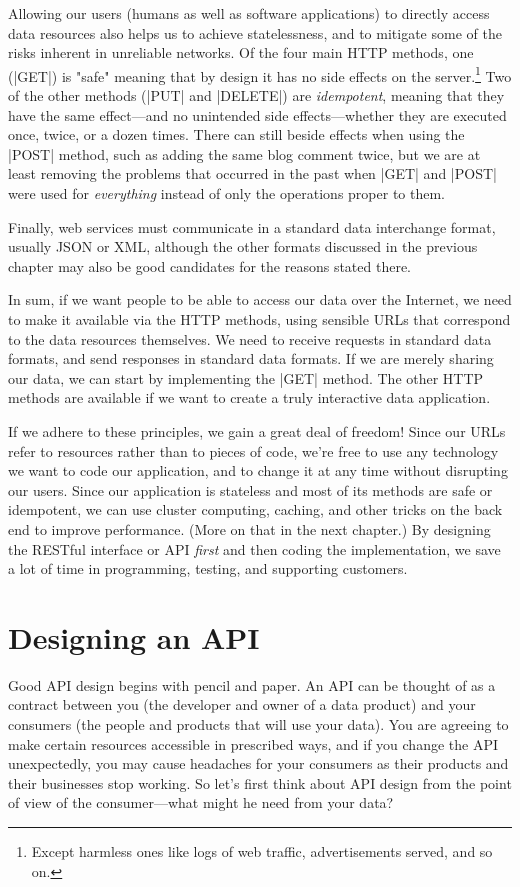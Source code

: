 \documentclass[11pt]{book}
\newcommand{\term}[1]{\emph{#1}} %
\begin{document}
Allowing our users (humans as well as software applications) to directly access data resources also helps us to achieve statelessness, and to mitigate some of the risks inherent in unreliable networks.  Of the four main HTTP methods, one (|GET|) is "safe" meaning that by design it has no side effects on the server.\footnote{Except harmless ones like logs of web traffic, advertisements served, and so on.}  Two of the other methods (|PUT| and |DELETE|) are \term{idempotent}, meaning that they have the same effect---and no unintended side effects---whether they are executed once, twice, or a dozen times.  There can still beside effects when using the |POST| method, such as adding the same blog comment twice, but we are at least removing the problems that occurred in the past when |GET| and |POST| were used for \emph{everything} instead of only the operations proper to them.

Finally, web services must communicate in a standard data interchange format, usually JSON or XML, although the other formats discussed in the previous chapter may also be good candidates for the reasons stated there.

In sum, if we want people to be able to access our data over the Internet, we need to make it available via the HTTP methods, using sensible URLs that correspond to the data resources themselves.  We need to receive requests in standard data formats, and send responses in standard data formats.  If we are merely sharing our data, we can start by implementing the |GET| method.  The other HTTP methods are available if we want to create a truly interactive data application.

If we adhere to these principles, we gain a great deal of freedom!  Since our URLs refer to resources rather than to pieces of code, we're free to use any technology we want to code our application, and to change it at any time without disrupting our users.  Since our application is stateless and most of its methods are safe or idempotent, we can use cluster computing, caching, and other tricks on the back end to improve performance.  (More on that in the next chapter.)  By designing the RESTful interface or API \emph{first} and then coding the implementation, we save a lot of time in programming, testing, and supporting customers.

\section{Designing an API}
Good API design begins with pencil and paper.  An API can be thought of as a contract between you (the developer and owner of a data product) and your consumers (the people and products that will use your data).  You are agreeing to make certain resources accessible in prescribed ways, and if you change the API unexpectedly, you may cause headaches for your consumers as their products and their businesses stop working.  So let's first think about API design from the point of view of the consumer---what might he need from your data?
\end{document}
